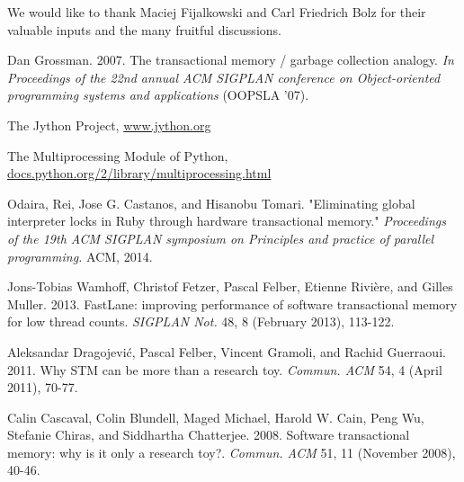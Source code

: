 \documentclass{sigplanconf}
\begin{document}


\acks
We would like to thank Maciej Fijalkowski and Carl Friedrich Bolz for
their valuable inputs and the many fruitful discussions.





\begin{thebibliography}{}
\softraggedright

  Dan Grossman. 2007. The transactional memory / garbage collection
  analogy. \emph{In Proceedings of the 22nd annual ACM SIGPLAN
    conference on Object-oriented programming systems and
    applications} (OOPSLA '07).

  The Jython Project, \url{www.jython.org}

  The Multiprocessing Module of Python,
  \url{docs.python.org/2/library/multiprocessing.html}

  Odaira, Rei, Jose G. Castanos, and Hisanobu Tomari.  "Eliminating
  global interpreter locks in Ruby through hardware transactional
  memory."  \emph{Proceedings of the 19th ACM SIGPLAN symposium on
    Principles and practice of parallel programming.} ACM, 2014.

  Jons-Tobias Wamhoff, Christof Fetzer, Pascal Felber, Etienne Rivière,
  and Gilles Muller. 2013. FastLane: improving performance of software
  transactional memory for low thread counts. \emph{SIGPLAN Not.} 48, 8
  (February 2013), 113-122.

 Aleksandar Dragojević, Pascal Felber, Vincent
  Gramoli, and Rachid Guerraoui. 2011. Why STM can be more than a
  research toy. \emph{Commun. ACM} 54, 4 (April 2011), 70-77.

  Calin Cascaval, Colin Blundell, Maged Michael, Harold W. Cain, Peng
  Wu, Stefanie Chiras, and Siddhartha Chatterjee. 2008. Software
  transactional memory: why is it only a research
  toy?. \emph{Commun. ACM} 51, 11 (November 2008), 40-46.


\end{thebibliography}
\end{document}
